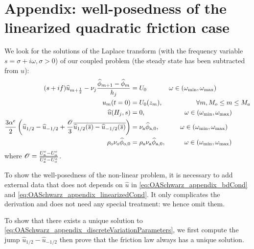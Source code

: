 \section{Appendix: well-posedness of the linearized quadratic friction case}
\label{sec:OASchwarz_appendix_discreteVariationParameters}
We look for the solutions of the Laplace transform
(with the frequency variable $s=\sigma + i\omega, \sigma>0$) of our
coupled problem (the steady state has been subtracted from $u$):
\begin{subequations}
	\label{eq:OASchwarz_appendix_discreteVariationParameters}
	\begin{align}
	(s + if) \widehat{u}_{m+\frac{1}{2}} -
		\nu_j \frac{\widehat{\phi}_{m+1} -
		\widehat{\phi}_m}{h_j}
		&=U_0
	\hspace{1.2cm} \omega \in
	(\omega_{\min},\omega_{\max})
		\label{eq:OASchwarz_appendix_eqFourier}\\
		u_m(t=0) &= U_0(z_m),   \hspace{1.8cm}
		\forall m, M_o \leq m \leq M_a \\
		\widehat{u}(H_j, s) &= 0,
		\hspace{2.1cm}
		\omega \in (\omega_{\min},\omega_{\max})
		\label{eq:OASchwarz_appendix_bdCond}\\
		\frac{3\alpha^e}{2} 
		\left( \widehat{u}_{1/2} - \widehat{u}_{-1/2}
		+ \frac{{\cal O}}{3} \overline{
			\widehat{u}_{1/2}(\overline{s}) -
		\widehat{u}_{-1/2}(\overline{s})} \right) &=
		\nu_{\rm a}\widehat{\phi}_{\rm a, 0},
		\hspace{1.12cm}
		\omega \in (\omega_{\min},\omega_{\max})
		\label{eq:OASchwarz_appendix_linearizedCond}
		\\
		\rho_{\rm o} \nu_{\rm o}\widehat{\phi}_{\rm o, 0}
		&= \rho_{\rm a} \nu_{\rm a}\widehat{\phi}_{\rm a, 0},
		\hspace{1.0cm}
		\omega \in (\omega_{\min},\omega_{\max})
		\label{eq:OASchwarz_appendix_continuityFlux}
		\end{align}
		\end{subequations}
where ${\cal O} = \frac{U_{\rm a}^e - U_{\rm o}^e}{\overline{U_{\rm a}^e
	- U_{\rm o}^e}}$.
\begin{remark}
	To show the well-posedness of the non-linear
	problem, it is necessary to add external data
	that does not depends on $\widehat{u}$
	in \eqref{eq:OASchwarz_appendix_bdCond} and
	\eqref{eq:OASchwarz_appendix_linearizedCond}.
	It only complicates the derivation and does not need
	any special treatment: we hence omit them.
\end{remark}
To show that there exists a unique solution to
\eqref{eq:OASchwarz_appendix_discreteVariationParameters},
we first compute the jump $\widehat{u}_{1/2} - \widehat{u}_{-1/2}$
then prove that the friction law always has a unique solution.
